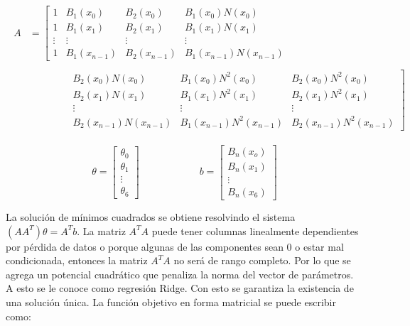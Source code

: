\begin{eqnarray}
\begin{aligned}
A & =
\left[\begin{matrix}
 1 & B_{1}(x_{0}) & B_{2}(x_0) & B_{1}(x_{0})N(x_{0})\\
 1 & B_{1}(x_{1}) & B_{2}(x_1) & B_{1}(x_{1})N(x_{1})\\
 \vdots & \vdots & \vdots & \vdots \\
 1 & B_{1}(x_{n-1}) & B_{2}(x_{n-1}) & B_{1}(x_{n-1})N(x_{n-1})
\end{matrix}\right.\\ \\
&\qquad\qquad
\left.\begin{matrix}
 B_{2}(x_{0})N(x_{0}) & B_{1}(x_{0})N^{2}(x_{0}) & B_{2}(x_{0})N^{2}(x_{0}) \\
 B_{2}(x_{1})N(x_{1}) & B_{1}(x_{1})N^{2}(x_{1}) & B_{2}(x_{1})N^{2}(x_{1}) \\
 \vdots & \vdots & \vdots\\
 B_{2}(x_{n-1})N(x_{n-1}) & B_{1}(x_{n-1})N^{2}(x_{n-1}) & B_{2}(x_{n-1})N^{2}(x_{n-1}) \nonumber 
\end{matrix}\right]
\end{aligned}
\end{eqnarray}

\begin{equation}
\theta = 
\begin{bmatrix}
\theta_{0} \\
\theta_{1} \\
\vdots \\
\theta_{6}
\end{bmatrix}
\qquad \qquad \qquad
b = 
\begin{bmatrix}
B_{n}(x_{o})\\
B_{n}(x_{1})\\
\vdots\\
B_{n}(x_{6}) \nonumber
\end{bmatrix}
\end{equation}

La solución de mínimos cuadrados se obtiene resolvindo el sistema $(AA^{T})\theta = A^{T}b$. La matriz $A^{T}A$ puede tener columnas linealmente dependientes por pérdida de datos o porque algunas de las componentes sean 0 o estar mal condicionada, entonces la matriz $A^{T}A$ no será de rango completo. Por lo que se agrega un potencial cuadrático que penaliza la norma del vector de parámetros. A esto se le conoce como regresión Ridge. Con esto se garantiza la existencia de una solución única. La función objetivo en forma matricial se puede escribir como: 


